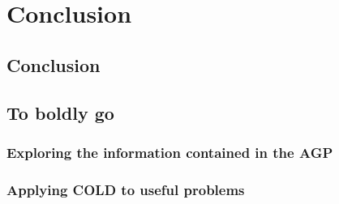 \part{Conclusion}

\chapter{Conclusion}\label{chap:8_Conclusion}

\chapter{To boldly go}\label{chap:9_Future_directions}

\section{Exploring the information contained in the AGP}

\section{Applying COLD to useful problems}